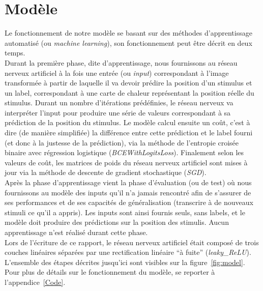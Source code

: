 \section{Modèle}
Le fonctionnement de notre modèle se basant sur des méthodes d'apprentissage automatisé (ou \textit{machine learning}), son fonctionnement peut être décrit en deux temps.\\
Durant la première phase, dite d'apprentissage, nous fournissons au réseau nerveux artificiel à la fois une entrée (ou \textit{input}) correspondant à l'image transformée à partir de laquelle il va devoir prédire la position d'un stimulus et un label, correspondant à une carte de chaleur représentant la position réelle du stimulus. 
Durant un nombre d'itérations prédéfinies, le réseau nerveux va interpréter l'input pour produire une série de valeurs correspondant à sa prédiction de la position du stimulus.
Le modèle calcul ensuite un coût, c'est à dire (de manière simplifiée) la différence entre cette prédiction et le label fourni (et donc à la justesse de la prédiction), via la méthode de l'entropie croisée binaire avec régression logistique (\textit{BCEWithLogitsLoss}).
Finalement selon les valeurs de coût, les matrices de poids du réseau nerveux artificiel sont mises à jour via la méthode de descente de gradient stochastique (\textit{SGD}). \\
Après la phase d'apprentissage vient la phase d'évaluation (ou de test) où nous fournissons au modèle des inputs qu'il n'a jamais rencontré afin de s'assurer de ses performances et de ses capacités de généralisation (transcrire à de nouveaux stimuli ce qu'il a appris).
Les inputs sont ainsi fournis seuls, sans labels, et le modèle doit produire des prédictions sur la position des stimulis.
Aucun apprentissage n'est réalisé durant cette phase. \\
Lors de l'écriture de ce rapport, le réseau nerveux artificiel était composé de trois couches linéaires séparées par une rectification linéaire ``à fuite'' (\textit{leaky\_ReLU}).
L'ensemble des étapes décrites jusqu'ici sont visibles sur la figure~\ref{fig:model}.
Pour plus de détails sur le fonctionnement du modèle, se reporter à l'appendice~\ref{Code}.